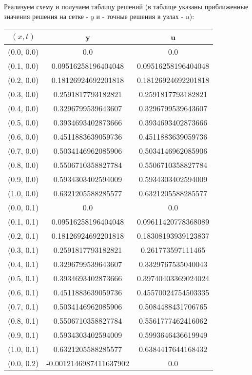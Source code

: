 Реализуем схему и получаем таблицу решений (в таблице указаны приближенные значения решения на сетке - $y$ и - точные решения в узлах - $u$):
\tiny
\begin{table}[H]
\begin{tabular}{|c|c|c|}
\hline
$(x,t)$ &  y & u \\
\hline
(0.0, 0.0) & 0.0 & 0.0 \\
\hline
(0.1, 0.0) & 0.09516258196404048 & 0.09516258196404048 \\
\hline
(0.2, 0.0) & 0.18126924692201818 & 0.18126924692201818 \\
\hline
(0.3, 0.0) & 0.2591817793182821 & 0.2591817793182821 \\
\hline
(0.4, 0.0) & 0.3296799539643607 & 0.3296799539643607 \\
\hline
(0.5, 0.0) & 0.3934693402873666 & 0.3934693402873666 \\
\hline
(0.6, 0.0) & 0.4511883639059736 & 0.4511883639059736 \\
\hline
(0.7, 0.0) & 0.5034146962085906 & 0.5034146962085906 \\
\hline
(0.8, 0.0) & 0.5506710358827784 & 0.5506710358827784 \\
\hline
(0.9, 0.0) & 0.5934303402594009 & 0.5934303402594009 \\
\hline
(1.0, 0.0) & 0.6321205588285577 & 0.6321205588285577 \\
\hline
\hline
(0.0, 0.1) & 0.0 & 0.0 \\
\hline
(0.1, 0.1) & 0.09516258196404048 & 0.09611420778368089 \\
\hline
(0.2, 0.1) & 0.18126924692201818 & 0.18308193939123837 \\
\hline
(0.3, 0.1) & 0.2591817793182821 & 0.261773597111465 \\
\hline
(0.4, 0.1) & 0.3296799539643607 & 0.3329767535040043 \\
\hline
(0.5, 0.1) & 0.3934693402873666 & 0.39740403369024024 \\
\hline
(0.6, 0.1) & 0.4511883639059736 & 0.45570024754503335 \\
\hline
(0.7, 0.1) & 0.5034146962085906 & 0.5084488431706765 \\
\hline
(0.8, 0.1) & 0.5506710358827784 & 0.5561777462416062 \\
\hline
(0.9, 0.1) & 0.5934303402594009 & 0.5993646436619949 \\
\hline
(1.0, 0.1) & 0.6321205588285577 & 0.6384417644168432 \\
\hline
\hline
(0.0, 0.2) & -0.0012146987411637902 & 0.0 \\

\end{tabular}
\end{table}
